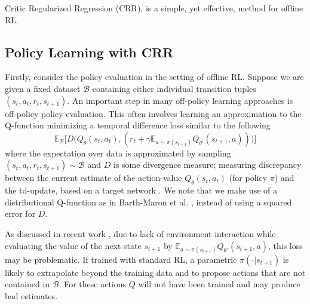 \documentclass[nohyperref]{article}
\theoremstyle{plain}
\theoremstyle{definition}
\theoremstyle{remark}
\begin{document}
Critic Regularized Regression (CRR), is a simple, yet effective, method for offline RL.

\subsection{Policy Learning with CRR}

Firstly, consider the policy evaluation in the setting of offline RL. Suppose we are given a fixed dataset $\mathcal{B}$ containing either individual transition tuples $(s_t, a_t, r_t, s_{t+1})$. An important step in many off-policy learning approaches is off-policy policy evaluation. This often involves learning an approximation to the Q-function minimizing a temporal difference loss similar to the following
\begin{equation}\label{eq1}
    \mathbb{E}_{\mathcal{B}}\Big[D\big(Q_\theta(s_t, a_t), (r_t+\gamma\mathbb{E}_{a\sim\pi(s_{t+1})}Q_{\theta'}(s_{t+1}, a))\big)\Big]
\end{equation}
where the expectation over data is approximated by sampling $(s_t, a_t, r_t, s_{t+1})\sim\mathcal{B}$ and $D$ is some divergence measure; measuring discrepancy between the current estimate of the action-value $Q_\theta(s_t, a_t)$ (for policy $\pi$) and the td-update, based on a target network \cite{mnih2015human}. We note that we make use of a distributional Q-function as in Barth-Maron et al. \cite{barth2018distributed}, instead of using a squared error for $D$.

As discussed in recent work \cite{fujimoto2019off}, due to lack of environment interaction while evaluating the value of the next state $s_{t+1}$ by $\mathbb{E}_{a\sim\pi(s_{t+1})}Q_{\theta'}(s_{t+1}, a)$, this loss may be problematic. If trained with standard RL, a parametric $\pi(\cdot|s_{t+1})$ is likely to extrapolate beyond the training data and to propose actions that are not contained in $\mathcal{B}$. For these actions $Q$ will not have been trained and may produce bad estimates.
\end{document}
